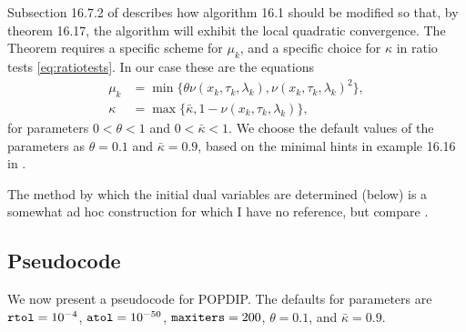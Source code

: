\documentclass[11pt]{article}
\begin{document}
Subsection 16.7.2 of \cite{GrivaNashSofer2009} describes how algorithm 16.1 should be modified so that, by theorem 16.17, the algorithm will exhibit the local quadratic convergence.  The Theorem requires a specific scheme for $\mu_k$, and a specific choice for $\kappa$ in ratio tests \eqref{eq:ratiotests}.  In our case these are the equations
\begin{align}
\mu_k &= \min\{\theta \nu(x_k,\tau_k,\lambda_k),\nu(x_k,\tau_k,\lambda_k)^2\}, \label{eq:muupdate} \\
\kappa &= \max\{\bar\kappa,1-\nu(x_k,\tau_k,\lambda_k)\}, \label{eq:kappaformula}
\end{align}
for parameters $0<\theta<1$ and $0<\bar\kappa<1$.  We choose the default values of the parameters as $\theta=0.1$ and $\bar\kappa=0.9$, based on the minimal hints in example 16.16 in \cite{GrivaNashSofer2009}.

The method by which the initial dual variables are determined (below) is a somewhat ad hoc construction for which I have no reference, but compare \cite{Gertzetal2004}.


\subsection*{Pseudocode}

We now present a pseudocode for POPDIP.  The defaults for parameters are $\text{\texttt{rtol}}=10^{-4}$, $\text{\texttt{atol}}=10^{-50}$, $\text{\texttt{maxiters}}=200$, $\theta=0.1$, and $\bar\kappa=0.9$.
\end{document}
